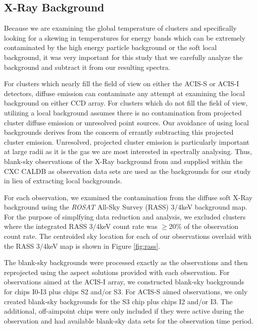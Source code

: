 \documentclass[12pt, preprint]{aastex}
\begin{document}
\subsection{X-Ray Background} \label{sec:background}

Because we are examining the global temperature of clusters and
specifically looking for a skewing in temperatures for energy bands
which can be extremely contaminated by the high energy particle
background or the soft local background, it was very important for
this study that we carefully analyze the background and subtract it
from our resulting spectra.

For clusters which nearly fill the field of view on
either the ACIS-S or ACIS-I detectors, diffuse emission can contaminate
any attempt at examining the local background on either CCD array. For clusters which do
not fill the field of view, utilizing a local background assumes there
is no contamination from projected cluster diffuse emission or unresolved
point sources. Our avoidance of using local backgrounds derives from
the concern of errantly subtracting this projected cluster
emission. Unresolved, projected cluster emission is
particularly important at large radii as it is the gas we are most interested in
spectrally analysing. Thus, blank-sky observations of the X-Ray background from
\cite{2001ApJ...562L.153M} and supplied within the CXC CALDB as
observation data sets are used as the backgrounds for our study in
lieu of extracting local backgrounds.

For each observation, we examined the
contamination from the diffuse soft X-Ray background using the {\textit{ROSAT}} All-Sky
Survey (RASS) $3/4$keV background map. For the purpose
of simplfying data reduction and analysis, we excluded clusters where
the integrated RASS $3/4$keV count rate was $\geq 20\%$ of the
observation count rate. The centroided sky location for each of our
observations overlaid with the RASS $3/4$keV map is shown in Figure \ref{fig:rass}.

The blank-sky backgrounds were processed exactly as the
observations and then reprojected using the aspect solutions provided
with each observation. For observations aimed at the ACIS-I array, we
constructed blank-sky backgrounds for chips I0-I3 plus chips S2 and/or S3.
For ACIS-S aimed observations, we only created blank-sky backgrounds for the S3
chip plus chips I2 and/or I3. The additional, off-aimpoint chips were only included 
if they were active during the observation and had
available blank-sky data sets for the observation time period.
\end{document}
